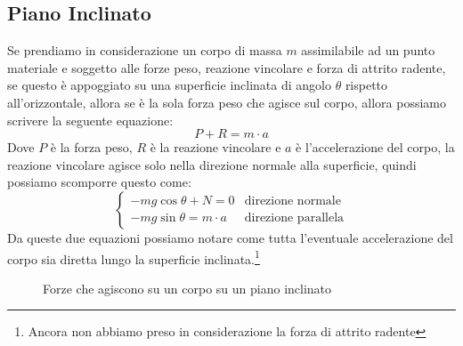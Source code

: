     \subsection{Piano Inclinato}
        Se prendiamo in considerazione un corpo di massa $m$ assimilabile ad un punto materiale e soggetto alle forze peso, reazione vincolare e forza di attrito radente, se questo è appoggiato su una superficie inclinata di angolo $\theta$ rispetto all'orizzontale, allora se è la sola forza peso che agisce sul corpo, allora possiamo scrivere la seguente equazione:
        $$
            P + R = m\cdot a
        $$
        Dove $P$ è la forza peso, $R$ è la reazione vincolare e $a$ è l'accelerazione del corpo, la reazione vincolare agisce solo nella direzione normale alla superficie, quindi possiamo scomporre questo come:
        $$
            \begin{cases}
                -mg\cos \theta + N = 0 & \text{direzione normale} \\
                -mg\sin \theta = m\cdot a & \text{direzione parallela}
            \end{cases}
        $$
        Da queste due equazioni possiamo notare come tutta l'eventuale accelerazione del corpo sia diretta lungo la superficie inclinata.\footnote{Ancora non abbiamo preso in considerazione la forza di attrito radente}
        \begin{figure}[H]
            \centering
            \caption{Forze che agiscono su un corpo su un piano inclinato}
            \label{fig:pianoInclinato}
        \end{figure}
